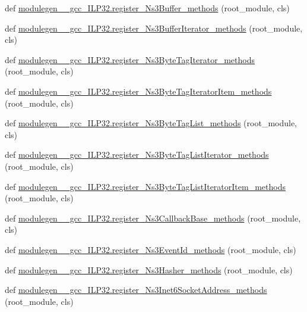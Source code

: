 \begin{DoxyCompactItemize}
def \hyperlink{namespacemodulegen____gcc__ILP32_a03d0a1e8a8592e4ba6f8ede106e1296e}{modulegen\+\_\+\+\_\+gcc\+\_\+\+I\+L\+P32.\+register\+\_\+\+Ns3\+Buffer\+\_\+methods} (root\+\_\+module, cls)
\item 
def \hyperlink{namespacemodulegen____gcc__ILP32_a878cdb9dc61acbc26f4e03349fb4d5ab}{modulegen\+\_\+\+\_\+gcc\+\_\+\+I\+L\+P32.\+register\+\_\+\+Ns3\+Buffer\+Iterator\+\_\+methods} (root\+\_\+module, cls)
\item 
def \hyperlink{namespacemodulegen____gcc__ILP32_ae03f3c65da14af22cebfe1ccadfd8c7d}{modulegen\+\_\+\+\_\+gcc\+\_\+\+I\+L\+P32.\+register\+\_\+\+Ns3\+Byte\+Tag\+Iterator\+\_\+methods} (root\+\_\+module, cls)
\item 
def \hyperlink{namespacemodulegen____gcc__ILP32_a3ebfdd7dfa69d398fc1a31f3343bd057}{modulegen\+\_\+\+\_\+gcc\+\_\+\+I\+L\+P32.\+register\+\_\+\+Ns3\+Byte\+Tag\+Iterator\+Item\+\_\+methods} (root\+\_\+module, cls)
\item 
def \hyperlink{namespacemodulegen____gcc__ILP32_a9d8234bc8a131df2df32c5f735b30ad9}{modulegen\+\_\+\+\_\+gcc\+\_\+\+I\+L\+P32.\+register\+\_\+\+Ns3\+Byte\+Tag\+List\+\_\+methods} (root\+\_\+module, cls)
\item 
def \hyperlink{namespacemodulegen____gcc__ILP32_ae0126e4036279c9c41f9ac4d00a6a681}{modulegen\+\_\+\+\_\+gcc\+\_\+\+I\+L\+P32.\+register\+\_\+\+Ns3\+Byte\+Tag\+List\+Iterator\+\_\+methods} (root\+\_\+module, cls)
\item 
def \hyperlink{namespacemodulegen____gcc__ILP32_a14b17aa2d90542379fe16aec66129b68}{modulegen\+\_\+\+\_\+gcc\+\_\+\+I\+L\+P32.\+register\+\_\+\+Ns3\+Byte\+Tag\+List\+Iterator\+Item\+\_\+methods} (root\+\_\+module, cls)
\item 
def \hyperlink{namespacemodulegen____gcc__ILP32_a0eba0aa92f0bdc57a46a1520487f32d1}{modulegen\+\_\+\+\_\+gcc\+\_\+\+I\+L\+P32.\+register\+\_\+\+Ns3\+Callback\+Base\+\_\+methods} (root\+\_\+module, cls)
\item 
def \hyperlink{namespacemodulegen____gcc__ILP32_a380e15c15390ba7c3f21a3162cb67911}{modulegen\+\_\+\+\_\+gcc\+\_\+\+I\+L\+P32.\+register\+\_\+\+Ns3\+Event\+Id\+\_\+methods} (root\+\_\+module, cls)
\item 
def \hyperlink{namespacemodulegen____gcc__ILP32_a33425c5d69b8b6e93c725709f6aa95fb}{modulegen\+\_\+\+\_\+gcc\+\_\+\+I\+L\+P32.\+register\+\_\+\+Ns3\+Hasher\+\_\+methods} (root\+\_\+module, cls)
\item 
def \hyperlink{namespacemodulegen____gcc__ILP32_a8fa0508ee2e0cd45868b24b9c7f47ea6}{modulegen\+\_\+\+\_\+gcc\+\_\+\+I\+L\+P32.\+register\+\_\+\+Ns3\+Inet6\+Socket\+Address\+\_\+methods} (root\+\_\+module, cls)

\end{DoxyCompactItemize}
